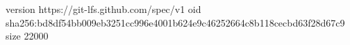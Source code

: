 version https://git-lfs.github.com/spec/v1
oid sha256:bd8df54bb009eb3251cc996e4001b624e9c46252664c8b118cecbd63f28d67c9
size 22000
